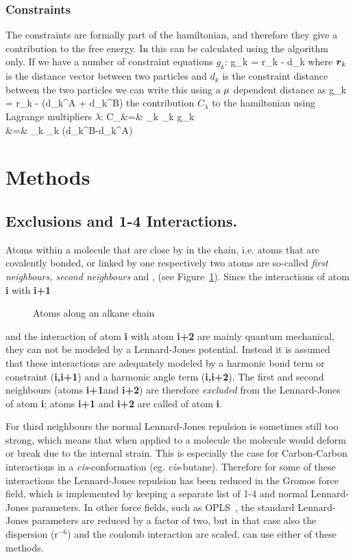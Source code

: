 \subsubsection{Constraints}
\newcommand{\clam}{C_{\lambda}}
The constraints are formally part of the hamiltonian, and therefore
they give a contribution to the free energy. In {\gromacs} this can be
calculated using the  algorithm only.
If we have a number of constraint equations $g_k$:
\beq
g_k	=	r_{k} - d_{k}
\eeq
where $\mbox{\boldmath ${r}$}_k$ is the distance vector between two particles and 
$d_k$ is the constraint distance between the two particles we can write
this using a $\mu$ dependent distance as
\beq
g_k 	=	r_{k} - \left(\LL d_{k}^A + \LAM d_k^B\right)
\eeq
the contribution $\clam$ 
to the hamiltonian using Lagrange multipliers $\lambda$:
\bea
\clam		&=&	\sum_k \lambda_k g_k	\\
\dvdl{\clam}	&=&	\sum_k \lambda_k \left(d_k^B-d_k^A\right)
\eea


\section{Methods}
\subsection{Exclusions and 1-4 Interactions.}
Atoms within a molecule that are close by in the chain, 
i.e. atoms that are covalently bonded, or linked by one respectively two
atoms are so-called {\em first neighbours, second neighbours} and 
{\em {}}, (see Figure~\ref{fig:chain}). Since the
interactions of atom {\bf i} with {\bf i+1} 
\begin {figure}
\centerline{}
\caption{Atoms along an alkane chain}
\label{fig:chain}
\end {figure}
and the interaction of atom {\bf i} with atom {\bf i+2} are mainly
quantum mechanical, they can not be modeled by a Lennard-Jones potential.
Instead it is assumed that these interactions are adequately modeled
by a harmonic bond term or constraint ({\bf i,i+1}) and a harmonic angle term
({\bf i,i+2}). The first and second neighbours (atoms {\bf i+1}and {\bf i+2}) 
are therefore
{\em excluded} from the Lennard-Jones  
of atom {\bf i};
atoms {\bf i+1} and {\bf i+2} are called {\em {}} of atom {\bf i}.

For third neighbours the normal Lennard-Jones repulsion is sometimes
still too strong, which means that when applied to a molecule the
molecule would deform or break due to the internal strain. This is
especially the case for Carbon-Carbon interactions in a {\em
cis}-conformation (eg. {\em cis}-butane).  Therefore for some of these
interactions the Lennard-Jones repulsion has been reduced in the
Gromos force field, which is implemented by keeping a separate list of
1-4 and normal Lennard-Jones parameters. In other force fields, such
as OPLS~\cite{Jorgensen88}, the standard Lennard-Jones parameters are reduced
by a factor of two, but in that case also the dispersion (r$^{-6}$)
and the coulomb interaction are scaled.
{\gromacs} can use either of these methods.

